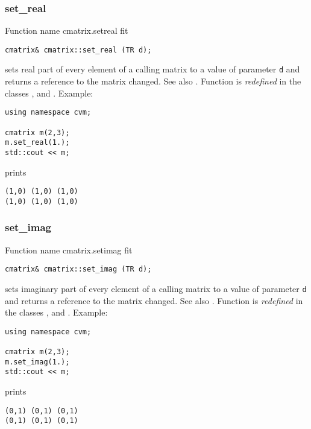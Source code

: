 \subsubsection{set\_real}
Function%
\pdfdest name {cmatrix.setreal} fit
\begin{verbatim}
cmatrix& cmatrix::set_real (TR d);
\end{verbatim}
sets real part of every element of a calling matrix to a value of
parameter \verb"d"
and returns a reference to the matrix changed.
See also .
Function is \emph{redefined} in the classes
,  
and .
Example:
\begin{Verbatim}
using namespace cvm;

cmatrix m(2,3);
m.set_real(1.);
std::cout << m;
\end{Verbatim}
prints
\begin{Verbatim}
(1,0) (1,0) (1,0)
(1,0) (1,0) (1,0)
\end{Verbatim}
\newpage



\subsubsection{set\_imag}
Function%
\pdfdest name {cmatrix.setimag} fit
\begin{verbatim}
cmatrix& cmatrix::set_imag (TR d);
\end{verbatim}
sets imaginary part of every element of a calling matrix to a value of
parameter \verb"d"
and returns a reference to the matrix changed.
See also .
Function is \emph{redefined} in the classes
,  
and .
Example:
\begin{Verbatim}
using namespace cvm;

cmatrix m(2,3);
m.set_imag(1.);
std::cout << m;
\end{Verbatim}
prints
\begin{Verbatim}
(0,1) (0,1) (0,1)
(0,1) (0,1) (0,1)
\end{Verbatim}
\newpage



